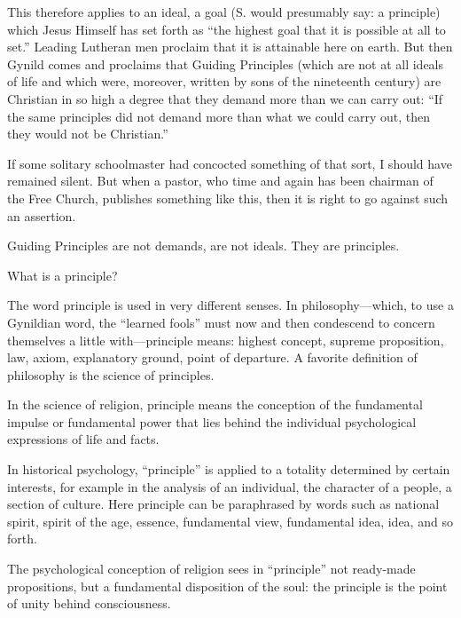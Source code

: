 This therefore applies to an ideal, a goal (S. would presumably say: a principle) which Jesus Himself has set forth as “the highest goal that it is possible at all to set.” Leading Lutheran men proclaim that it is attainable here on earth. But then Gynild comes and proclaims that Guiding Principles (which are not at all ideals of life and which were, moreover, written by sons of the nineteenth century) are Christian in so high a degree that they demand more than we can carry out: “If the same principles did not demand more than what we could carry out, then they would not be Christian.”

If some solitary schoolmaster had concocted something of that sort, I should have remained silent. But when a pastor, who time and again has been chairman of the Free Church, publishes something like this, then it is right to go against such an assertion.

Guiding Principles are not demands, are not ideals. They are principles.

What is a principle?

The word principle is used in very different senses. In philosophy—which, to use a Gynildian word, the “learned fools” must now and then condescend to concern themselves a little with—principle means: highest concept, supreme proposition, law, axiom, explanatory ground, point of departure. A favorite definition of philosophy is the science of principles.

In the science of religion, principle means the conception of the fundamental impulse or fundamental power that lies behind the individual psychological expressions of life and facts.

In historical psychology, “principle” is applied to a totality determined by certain interests, for example in the analysis of an individual, the character of a people, a section of culture. Here principle can be paraphrased by words such as national spirit, spirit of the age, essence, fundamental view, fundamental idea, idea, and so forth.

The psychological conception of religion sees in “principle” not ready-made propositions, but a fundamental disposition of the soul: the principle is the point of unity behind consciousness.


